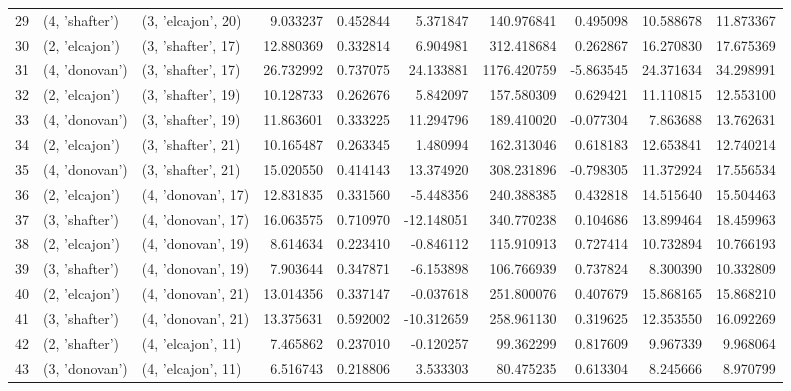 \begin{tabular}{lllrrrrrrr}
29 &   (4, 'shafter') &  (3, 'elcajon', 20) &   9.033237 &  0.452844 &   5.371847 &   140.976841 &  0.495098 &  10.588678 &  11.873367 \\
30 &   (2, 'elcajon') &  (3, 'shafter', 17) &  12.880369 &  0.332814 &   6.904981 &   312.418684 &  0.262867 &  16.270830 &  17.675369 \\
31 &   (4, 'donovan') &  (3, 'shafter', 17) &  26.732992 &  0.737075 &  24.133881 &  1176.420759 & -5.863545 &  24.371634 &  34.298991 \\
32 &   (2, 'elcajon') &  (3, 'shafter', 19) &  10.128733 &  0.262676 &   5.842097 &   157.580309 &  0.629421 &  11.110815 &  12.553100 \\
33 &   (4, 'donovan') &  (3, 'shafter', 19) &  11.863601 &  0.333225 &  11.294796 &   189.410020 & -0.077304 &   7.863688 &  13.762631 \\
34 &   (2, 'elcajon') &  (3, 'shafter', 21) &  10.165487 &  0.263345 &   1.480994 &   162.313046 &  0.618183 &  12.653841 &  12.740214 \\
35 &   (4, 'donovan') &  (3, 'shafter', 21) &  15.020550 &  0.414143 &  13.374920 &   308.231896 & -0.798305 &  11.372924 &  17.556534 \\
36 &   (2, 'elcajon') &  (4, 'donovan', 17) &  12.831835 &  0.331560 &  -5.448356 &   240.388385 &  0.432818 &  14.515640 &  15.504463 \\
37 &   (3, 'shafter') &  (4, 'donovan', 17) &  16.063575 &  0.710970 & -12.148051 &   340.770238 &  0.104686 &  13.899464 &  18.459963 \\
38 &   (2, 'elcajon') &  (4, 'donovan', 19) &   8.614634 &  0.223410 &  -0.846112 &   115.910913 &  0.727414 &  10.732894 &  10.766193 \\
39 &   (3, 'shafter') &  (4, 'donovan', 19) &   7.903644 &  0.347871 &  -6.153898 &   106.766939 &  0.737824 &   8.300390 &  10.332809 \\
40 &   (2, 'elcajon') &  (4, 'donovan', 21) &  13.014356 &  0.337147 &  -0.037618 &   251.800076 &  0.407679 &  15.868165 &  15.868210 \\
41 &   (3, 'shafter') &  (4, 'donovan', 21) &  13.375631 &  0.592002 & -10.312659 &   258.961130 &  0.319625 &  12.353550 &  16.092269 \\
42 &   (2, 'shafter') &  (4, 'elcajon', 11) &   7.465862 &  0.237010 &  -0.120257 &    99.362299 &  0.817609 &   9.967339 &   9.968064 \\
43 &   (3, 'donovan') &  (4, 'elcajon', 11) &   6.516743 &  0.218806 &   3.533303 &    80.475235 &  0.613304 &   8.245666 &   8.970799 \\

\end{tabular}
